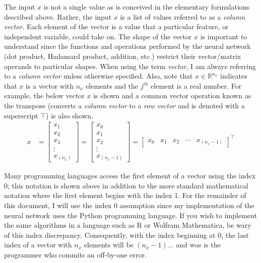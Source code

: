 \documentclass{article}
\begin{document}
The input $x$ is not a single value as is conceived in the elementary
formulations described above. Rather, the input $x$ is a list of
values referred to as a \textit{column vector}. Each element of the vector
is a value that a particular feature, or independent variable, could take on.
The shape of the vector $x$ is important to understand since the functions and operations
performed by the neural network (dot product, Hadamard product, addition, etc.)
restrict their vector/matrix operands to particular shapes. When using the term
\textit{vector}, I am always referring to a \textit{column vector}
unless otherwise specified. Also, note that $x \in \mathbb{R}^{n_x}$ indicates
that $x$ is a vector with $n_x$ elements and the $j^{th}$ element is a real number.
For example, the below vector $x$ is shown and a common vector operation
known as the transpose (converts a \textit{column vector} to a
\textit{row vector} and is denoted with a superscript $\top$) is also shown.
\begin{align}
	x & = \begin{bmatrix}
		x_{1}  \\
		x_{2}  \\
		x_{3}  \\
		\vdots \\
		x_{(n_x)}
	\end{bmatrix}
	=
	\begin{bmatrix}
		x_{0}  \\
		x_{1}  \\
		x_{2}  \\
		\vdots \\
		x_{(n_{x}-1)}
	\end{bmatrix}
	=
	\begin{bmatrix}
		x_{0} & x_{1} & x_{2} & \cdots & x_{(n_{x}-1)}
	\end{bmatrix}^\top
\end{align}

Many programming languages access the first element of a vector using the index
0; this notation is shown above in addition to the more standard
mathematical notation where the first element begins with the index 1.
For the remainder of this document, I will use the index 0 assumption
since my implementation of the neural network uses the Python
programming language. If you wish to implement the same algorithms in a language
such as R or Wolfram Mathematica, be wary of this index discrepancy.
Consequently, with the index beginning at 0, the last index of a vector with
$n_x$ elements will be $(n_x - 1)$... and woe is the programmer who commits an
off-by-one error.
\end{document}
